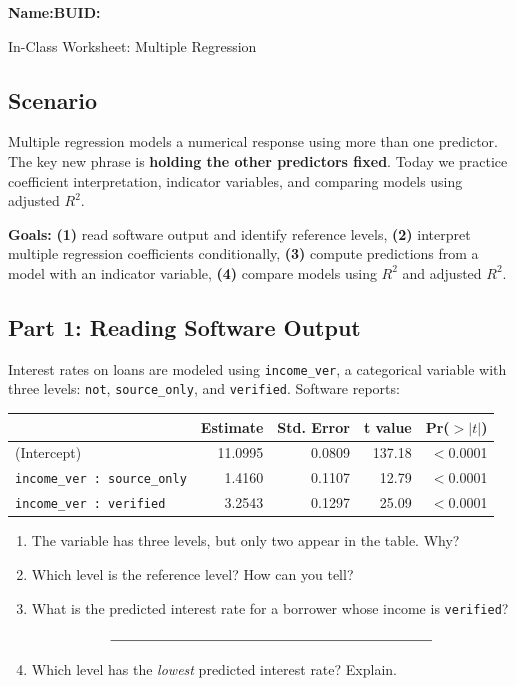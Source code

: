 \documentclass{article}
\newcommand{\blankline}[1]{\underline{\hspace{#1}}}
\begin{document}
\noindent\textbf{Name:}\blankline{2.25in}\hfill\textbf{BUID:}\blankline{1.55in}\newline

\begin{center}
 \Large In-Class Worksheet: Multiple Regression
\end{center}

\subsection*{Scenario}
Multiple regression models a numerical response using more than one predictor. The key new phrase is \textbf{holding the other predictors fixed}. Today we practice coefficient interpretation, indicator variables, and comparing models using adjusted $R^2$.

\medskip
\noindent\textbf{Goals:} \textbf{(1)} read software output and identify reference levels, \textbf{(2)} interpret multiple regression coefficients conditionally, \textbf{(3)} compute predictions from a model with an indicator variable, \textbf{(4)} compare models using $R^2$ and adjusted $R^2$.

\subsection*{Part 1: Reading Software Output}
Interest rates on loans are modeled using \texttt{income\_ver}, a categorical variable with three levels: \texttt{not}, \texttt{source\_only}, and \texttt{verified}. Software reports:

\begin{center}
\renewcommand{\arraystretch}{1.3}
\begin{tabular}{lrrrr}
\toprule
 & \textbf{Estimate} & \textbf{Std. Error} & \textbf{t value} & \textbf{Pr($>|t|$)} \\
\midrule
(Intercept) & 11.0995 & 0.0809 & 137.18 & $<$0.0001 \\
\texttt{income\_ver : source\_only} & 1.4160 & 0.1107 & 12.79 & $<$0.0001 \\
\texttt{income\_ver : verified} & 3.2543 & 0.1297 & 25.09 & $<$0.0001 \\
\bottomrule
\end{tabular}
\end{center}

\begin{enumerate}[label={\bfseries (\Alph*)},itemsep=.8em]
\item The variable has three levels, but only two appear in the table. Why? \\[3em]
\item Which level is the reference level? How can you tell? \\[3em]
\item What is the predicted interest rate for a borrower whose income is \texttt{verified}?
\[
\blankline{3.2in}
\]
\item Which level has the \emph{lowest} predicted interest rate? Explain. \\[3em]
\end{enumerate}
\end{document}
